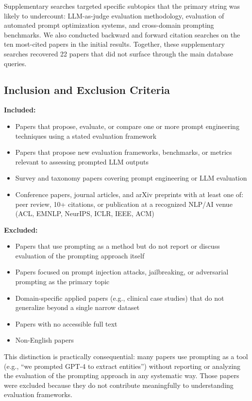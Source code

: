\documentclass[journal]{IEEEtran}
\begin{document}
Supplementary searches targeted specific subtopics that the primary
string was likely to undercount: LLM-as-judge evaluation methodology,
evaluation of automated prompt optimization systems, and cross-domain
prompting benchmarks.
We also conducted backward and forward citation searches on the
ten most-cited papers in the initial results. Together, these
supplementary searches recovered 22 papers that did not surface through the
main database queries.

\subsection{Inclusion and Exclusion Criteria}

\textbf{Included:}
\begin{itemize}
\item Papers that propose, evaluate, or compare one or more
prompt engineering techniques using a stated evaluation framework
\item Papers that propose new evaluation frameworks, benchmarks,
or metrics relevant to assessing prompted LLM outputs
\item Survey and taxonomy papers covering prompt engineering or
LLM evaluation
\item Conference papers, journal articles, and arXiv preprints
with at least one of: peer review, 10+ citations, or publication
at a recognized NLP/AI venue (ACL, EMNLP, NeurIPS, ICLR, IEEE,
ACM)
\end{itemize}

\textbf{Excluded:}
\begin{itemize}
\item Papers that use prompting as a method but do not report
or discuss evaluation of the prompting approach itself
\item Papers focused on prompt injection attacks, jailbreaking,
or adversarial prompting as the primary topic
\item Domain-specific applied papers (e.g., clinical case studies)
that do not generalize beyond a single narrow dataset
\item Papers with no accessible full text
\item Non-English papers
\end{itemize}

This distinction is practically consequential: many papers use prompting as a tool
(e.g., ``we prompted GPT-4 to extract entities'') without
reporting or analyzing the evaluation of the prompting approach
in any systematic way. Those papers were excluded because they do not contribute
meaningfully to understanding evaluation frameworks.
\end{document}
